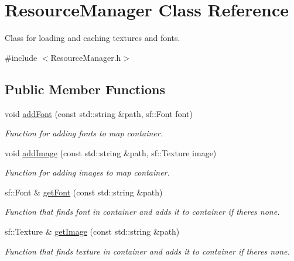 \hypertarget{classResourceManager}{}\section{Resource\+Manager Class Reference}
\label{classResourceManager}


Class for loading and caching textures and fonts.  




{\ttfamily \#include $<$Resource\+Manager.\+h$>$}

\subsection*{Public Member Functions}
\begin{DoxyCompactItemize}
\item 
void \hyperlink{classResourceManager_a0951c61ec5802848425c454bca158dd2}{add\+Font} (const std\+::string \&path, sf\+::\+Font font)
\begin{DoxyCompactList}\small\item\em Function for adding fonts to map container. \end{DoxyCompactList}\item 
void \hyperlink{classResourceManager_affb6d65a0596b60029689b84c51626ce}{add\+Image} (const std\+::string \&path, sf\+::\+Texture image)
\begin{DoxyCompactList}\small\item\em Function for adding images to map container. \end{DoxyCompactList}\item 
sf\+::\+Font \& \hyperlink{classResourceManager_a637994bf2af10045ba30ebd4cdc057c4}{get\+Font} (const std\+::string \&path)
\begin{DoxyCompactList}\small\item\em Function that finds font in container and adds it to container if there\textquotesingle{}s none. \end{DoxyCompactList}\item 
sf\+::\+Texture \& \hyperlink{classResourceManager_a68d4d106c0231cd486907805ac695d84}{get\+Image} (const std\+::string \&path)
\begin{DoxyCompactList}\small\item\em Function that finds texture in container and adds it to container if there\textquotesingle{}s none. \end{DoxyCompactList}\end{DoxyCompactItemize}

